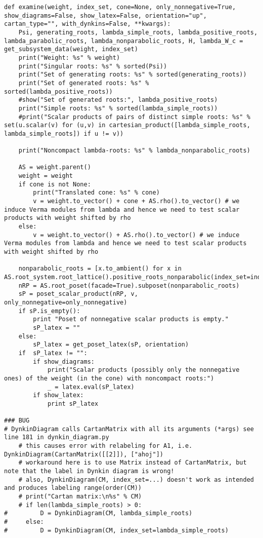 \begin{verbatim}
def examine(weight, index_set, cone=None, only_nonnegative=True, show_diagrams=False, show_latex=False, orientation="up", cartan_type="", with_dynkins=False, **kwargs):
    Psi, generating_roots, lambda_simple_roots, lambda_positive_roots, lambda_parabolic_roots, lambda_nonparabolic_roots, H, lambda_W_c = get_subsystem_data(weight, index_set)
    print("Weight: %s" % weight)
    print("Singular roots: %s" % sorted(Psi))
    print("Set of generating roots: %s" % sorted(generating_roots))
    print("Set of generated roots: %s" % sorted(lambda_positive_roots))
    #show("Set of generated roots:", lambda_positive_roots)
    print("Simple roots: %s" % sorted(lambda_simple_roots))
    #print("Scalar products of pairs of distinct simple roots: %s" % set(u.scalar(v) for (u,v) in cartesian_product([lambda_simple_roots, lambda_simple_roots]) if u != v))

    print("Noncompact lambda-roots: %s" % lambda_nonparabolic_roots)

    AS = weight.parent()
    weight = weight
    if cone is not None:
        print("Translated cone: %s" % cone)
        v = weight.to_vector() + cone + AS.rho().to_vector() # we induce Verma modules from lambda and hence we need to test scalar products with weight shifted by rho
    else:
        v = weight.to_vector() + AS.rho().to_vector() # we induce Verma modules from lambda and hence we need to test scalar products with weight shifted by rho

    nonparabolic_roots = [x.to_ambient() for x in AS.root_system.root_lattice().positive_roots_nonparabolic(index_set=index_set)]
    nRP = AS.root_poset(facade=True).subposet(nonparabolic_roots)
    sP = poset_scalar_product(nRP, v, only_nonnegative=only_nonnegative)
    if sP.is_empty():
        print "Poset of nonnegative scalar products is empty."
        sP_latex = ""
    else:
        sP_latex = get_poset_latex(sP, orientation)
    if  sP_latex != "":
        if show_diagrams:
            print("Scalar products (possibly only the nonnegative ones) of the weight (in the cone) with noncompact roots:")
            _ = latex.eval(sP_latex)
        if show_latex:
            print sP_latex

### BUG
# DynkinDiagram calls CartanMatrix with all its arguments (*args) see line 181 in dynkin_diagram.py
    # this causes error with relabeling for A1, i.e. DynkinDiagram(CartanMatrix([[2]]), ["ahoj"])
    # workaround here is to use Matrix instead of CartanMatrix, but note that the label in Dynkin diagram is wrong!
    # also, DynkinDiagram(CM, index_set=...) doesn't work as intended and produces labeling range(order(CM))
    # print("Cartan matrix:\n%s" % CM)
    # if len(lambda_simple_roots) > 0:
#         D = DynkinDiagram(CM, lambda_simple_roots)
#     else:
#         D = DynkinDiagram(CM, index_set=lambda_simple_roots)


\end{verbatim}
